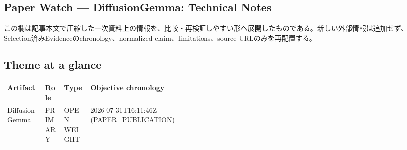 \clearpage
{}
\subsection*{Paper Watch — DiffusionGemma: Technical Notes}
この欄は記事本文で圧縮した一次資料上の情報を、比較・再検証しやすい形へ展開したものである。新しい外部情報は追加せず、Selection済みEvidenceのchronology、normalized claim、limitations、source URLのみを再配置する。
\medskip
\subsection*{Theme at a glance}
\begin{center}
\footnotesize
\begin{tabularx}{\linewidth}{@{}p{0.20\linewidth}p{0.10\linewidth}p{0.14\linewidth}X@{}}
\toprule
Artifact & Role & Type & Objective chronology \\
\midrule
DiffusionGemma & PRIMARY & OPEN WEIGHT & 2026-07-31T16:11:46Z (PAPER\_PUBLICATION) \\
\bottomrule
\end{tabularx}
\end{center}
\normalsize

